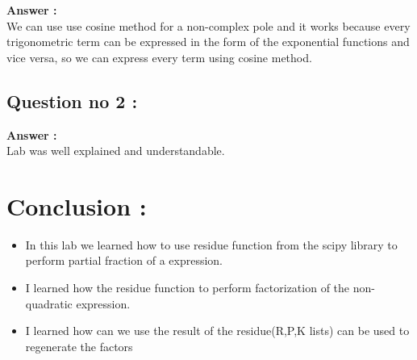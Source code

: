 \documentclass[11pt]{article}
\begin{document}
\textbf{Answer :} 
\\We can use use cosine method for a non-complex pole and it works because every trigonometric term can be expressed in the form of the exponential functions and vice versa, so we can express every term using cosine method.

{\subsection{Question no 2 :} }
\textbf{Answer :}
\\Lab was well explained and understandable.
\section{Conclusion :}
\begin{itemize}
\item In this lab we learned how to use residue function from the scipy library to perform partial fraction of a expression.
\item I learned how the residue function to perform factorization of the non-quadratic expression.
\item I learned how can we use the result of the residue(R,P,K lists) can be used to regenerate the factors 
\end{itemize}
\end{document}
